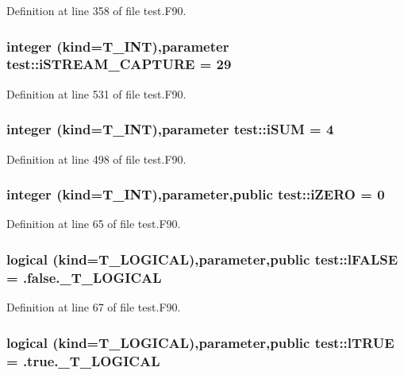 Definition at line 358 of file test.F90.

\hypertarget{namespacetest_a6dc6983b645899b34f357412d47018c5}{
\subsubsection[{iSTREAM\_\-CAPTURE}]{\setlength{\rightskip}{0pt plus 5cm}integer (kind={\bf T\_\-INT}),parameter {\bf test::iSTREAM\_\-CAPTURE} = 29}}
\label{namespacetest_a6dc6983b645899b34f357412d47018c5}


Definition at line 531 of file test.F90.

\hypertarget{namespacetest_acd0b0aa61e54ac17016b3ecb8846d4fb}{
\subsubsection[{iSUM}]{\setlength{\rightskip}{0pt plus 5cm}integer (kind={\bf T\_\-INT}),parameter {\bf test::iSUM} = 4}}
\label{namespacetest_acd0b0aa61e54ac17016b3ecb8846d4fb}


Definition at line 498 of file test.F90.

\hypertarget{namespacetest_a3014c474a511a7853327d17f396fea73}{
\subsubsection[{iZERO}]{\setlength{\rightskip}{0pt plus 5cm}integer (kind={\bf T\_\-INT}),parameter,public {\bf test::iZERO} = 0}}
\label{namespacetest_a3014c474a511a7853327d17f396fea73}


Definition at line 65 of file test.F90.

\hypertarget{namespacetest_ad44869e0204417021792170cd610ee25}{
\subsubsection[{lFALSE}]{\setlength{\rightskip}{0pt plus 5cm}logical (kind={\bf T\_\-LOGICAL}),parameter,public {\bf test::lFALSE} = .false.\_\-T\_\-LOGICAL}}
\label{namespacetest_ad44869e0204417021792170cd610ee25}


Definition at line 67 of file test.F90.

\hypertarget{namespacetest_ab7046de13f01778d86667e4266521664}{
\subsubsection[{lTRUE}]{\setlength{\rightskip}{0pt plus 5cm}logical (kind={\bf T\_\-LOGICAL}),parameter,public {\bf test::lTRUE} = .true.\_\-T\_\-LOGICAL}}
\label{namespacetest_ab7046de13f01778d86667e4266521664}


